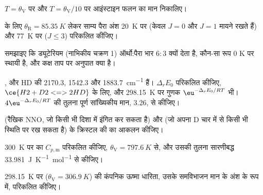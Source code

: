 \begin{exercise}[$\star$]\label{exo:b3:statistical-thermo-applied:2}
$T = \theta_{\mathrm V}$ पर और $T = \theta_{\mathrm V}/10$ पर आइंस्टाइन फलन का मान निकालिए।
\end{exercise}

\begin{exercise}[$\star$]\label{exo:b3:statistical-thermo-applied:3}
 के लिए $\theta_{\mathrm R} = \qty{85.35}{K}$ लेकर साम्य पैरा अंश
\qty{20}{K} पर (केवल $J = 0$ और $J = 1$ मायने रखते हैं) और \qty{77}{K} पर ($J \le 3$) परिकलित कीजिए।
\end{exercise}

\begin{exercise}[$\star$]\label{exo:b3:statistical-thermo-applied:4}
समझाइए कि ड्यूटेरियम (नाभिकीय चक्रण 1) ऑर्थो:पैरा भार $6 : 3$ क्यों देता है, कौन-सा
रूप 0 K पर स्थायी है, और कक्ष ताप पर अनुपात क्या है।
\end{exercise}

\begin{exercise}[$\star\star$]\label{exo:b3:statistical-thermo-applied:5}
,  और HD की  2170.3, 1542.3 और
\qty{1883.7}{cm^{-1}} हैं। $\Delta_rE_0$ परिकलित कीजिए, $\ce{H2 + D2 <=> 2 HD}$ के लिए, और \qty{298.15}{K} पर गुणक $\eu^{-\Delta_rE_0/RT}$
भी। $4\eu^{-\Delta_rE_0/RT}$ की तुलना पूर्ण सांख्यिकीय मान, 3.26, से कीजिए।
\end{exercise}

\begin{exercise}[$\star\star$]\label{exo:b3:statistical-thermo-applied:6}
 (रैखिक NNO, जो किसी भी दिशा में
इंगित कर सकता है) और  (जो अपना D चार में से किसी भी
स्थिति पर रख सकता है) के क्रिस्टल की  का आकलन कीजिए।
\end{exercise}

\begin{exercise}[$\star\star$]\label{exo:b3:statistical-thermo-applied:7}
\qty{300}{K} पर  का $C_{p,\mathrm m}$ परिकलित कीजिए, $\theta_{\mathrm V} = \qty{797.6}{K}$ से, और उसकी तुलना
सारणीबद्ध \qty{33.981}{J.K^{-1}.mol^{-1}} से कीजिए।
\end{exercise}

\begin{exercise}[$\star\star$]\label{exo:b3:statistical-thermo-applied:8}
\qty{298.15}{K} पर  ($\theta_{\mathrm V} = \qty{306.9}{K}$) की कंपनिक ऊष्मा धारिता,
उसके समविभाजन मान के अंश के रूप में, परिकलित कीजिए।
\end{exercise}

